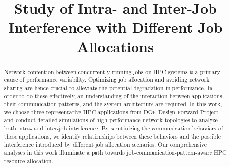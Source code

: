 \documentclass[conference]{IEEEtran}
\begin{document}
%
\title{Study of Intra- and Inter-Job Interference with Different Job Allocations}
\author{



}

\maketitle


\begin{abstract} 

Network contention between concurrently running jobs on HPC systems is a primary cause of performance variability. Optimizing job allocation and avoiding network sharing are hence crucial to alleviate the potential degradation in performance. In order to do these effectively, an understanding of the interaction between applications, their communication patterns, and the system architecture are required. In this work, we choose three representative HPC applications from DOE Design Forward Project and conduct detailed simulations of high-performance network topologies to analyze both intra- and inter-job interference. By scrutinizing the communication behaviors of these applications, we identify relationships between these behaviors and the possible interference introduced by different job allocation scenarios. Our comprehensive analyses in this work illuminate a path towards job-communication-pattern-aware HPC resource allocation.


\end{abstract}

\IEEEpeerreviewmaketitle
\end{document}
